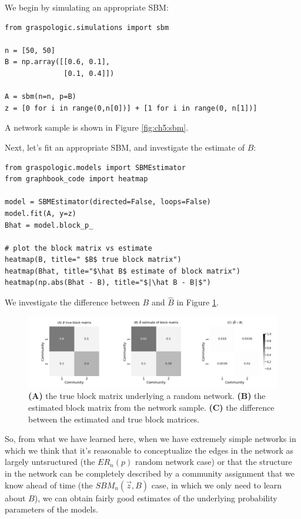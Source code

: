 We begin by simulating an appropriate SBM:

\begin{lstlisting}[style=python]
from graspologic.simulations import sbm

n = [50, 50]
B = np.array([[0.6, 0.1], 
              [0.1, 0.4]])

A = sbm(n=n, p=B)
z = [0 for i in range(0,n[0])] + [1 for i in range(0, n[1])]
\end{lstlisting}

A network sample is shown in Figure \ref{fig:ch5:sbm}.

Next, let's fit an appropriate SBM, and investigate the estimate of $B$:

\begin{lstlisting}[style=python]
from graspologic.models import SBMEstimator
from graphbook_code import heatmap

model = SBMEstimator(directed=False, loops=False)
model.fit(A, y=z)
Bhat = model.block_p_

# plot the block matrix vs estimate
heatmap(B, title=" $B$ true block matrix")
heatmap(Bhat, title="$\hat B$ estimate of block matrix")
heatmap(np.abs(Bhat - B), title="$|\hat B - B|$")
\end{lstlisting}

We investigate the difference between $B$ and $\hat B$ in Figure \ref{fig:ch6:sbm_est}.

\begin{figure}
    \centering
    \includegraphics[width=\linewidth]{representations/ch6/Images/sbm_est.png}
    \caption[Estimating block matrix of SBM]{\textbf{(A)} the true block matrix underlying a random network. \textbf{(B)} the estimated block matrix from the network sample. \textbf{(C)} the difference between the estimated and true block matrices.}
    \label{fig:ch6:sbm_est}
\end{figure}

So, from what we have learned here, when we have extremely simple networks in which we think that it's reasonable to conceptualize the edges in the network as largely untsructured (the $ER_n(p)$ random network case) or that the structure in the network can be completely described by a community assignment that we know ahead of time (the $SBM_n(\vec z, B)$ case, in which we only need to learn about $B$), we can obtain fairly good estimates of the underlying probability parameters of the models.

\newpage